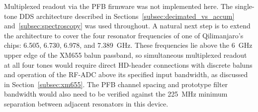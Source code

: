 Multiplexed readout via the \QICK{} PFB firmware was not implemented here.  The
single-tone DDS architecture described in
Sections~\ref{subsec:decimated_vs_accum} and~\ref{subsec:spectroscopy} was used
throughout.  A natural next step is to extend the architecture to cover the four
resonator frequencies of one of Qilimanjaro's chips: 6.505, 6.730, 6.978,
and \SI{7.389}{\giga\hertz}.  These frequencies lie above the \SI{6}{\giga\hertz}
upper edge of the XM655 balun passband, so simultaneous multiplexed readout at all
four tones would require direct HD-header connections with discrete baluns and
operation of the RF-ADC above its specified input bandwidth, as
discussed in Section~\ref{subsec:xm655}.  The PFB channel spacing and prototype
filter bandwidth would also need to be verified against the \SI{225}{\mega\hertz}
minimum separation between adjacent resonators in this device.
